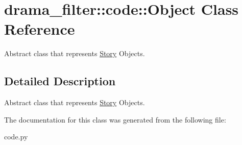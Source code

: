 \hypertarget{classdrama__filter_1_1code_1_1Object}{
\section{drama\_\-filter::code::Object Class Reference}
\label{classdrama__filter_1_1code_1_1Object}
}


Abstract class that represents \hyperlink{classdrama__filter_1_1code_1_1Story}{Story} Objects.  




\subsection{Detailed Description}
Abstract class that represents \hyperlink{classdrama__filter_1_1code_1_1Story}{Story} Objects. 

The documentation for this class was generated from the following file:\begin{DoxyCompactItemize}
\item 
code.py\end{DoxyCompactItemize}
